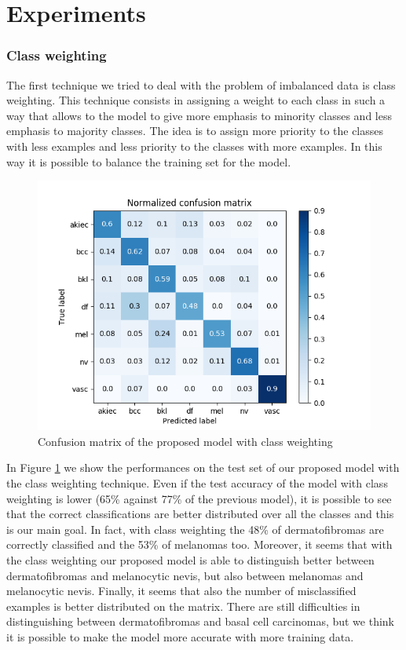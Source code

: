 \section{Experiments} \label{experiments}
		
	\subsubsection{Class weighting}
	
		The first technique we tried to deal with the problem of imbalanced data is class weighting. This technique consists in assigning a weight to each class in such a way that allows to the model to give more emphasis to minority classes and less emphasis to majority classes. The idea is to assign more priority to the classes with less examples and less priority to the classes with more examples. In this way it is possible to balance the training set for the model. 
		
		\begin{figure}[H]
			\centering
			\includegraphics[width=14cm]{images/secondMatrix.png}
			\caption{Confusion matrix of the proposed model with class weighting}
			\label{fig:second-matrix}
		\end{figure}
		
		In Figure \ref{fig:second-matrix} we show the performances on the test set of our proposed model with the class weighting technique.
		Even if the test accuracy of the model with class weighting is lower (65\% against 77\% of the previous model), it is possible to see that the correct classifications are better distributed over all the classes and this is our main goal. In fact, with class weighting the 48\% of dermatofibromas are correctly classified and the 53\% of melanomas too. Moreover, it seems that with the class weighting our proposed model is able to distinguish better between dermatofibromas and melanocytic nevis, but also between melanomas and melanocytic nevis. Finally, it seems that also the number of misclassified examples is better distributed on the matrix. There are still difficulties in distinguishing between dermatofibromas and basal cell carcinomas, but we think it is possible to make the model more accurate with more training data.
		

